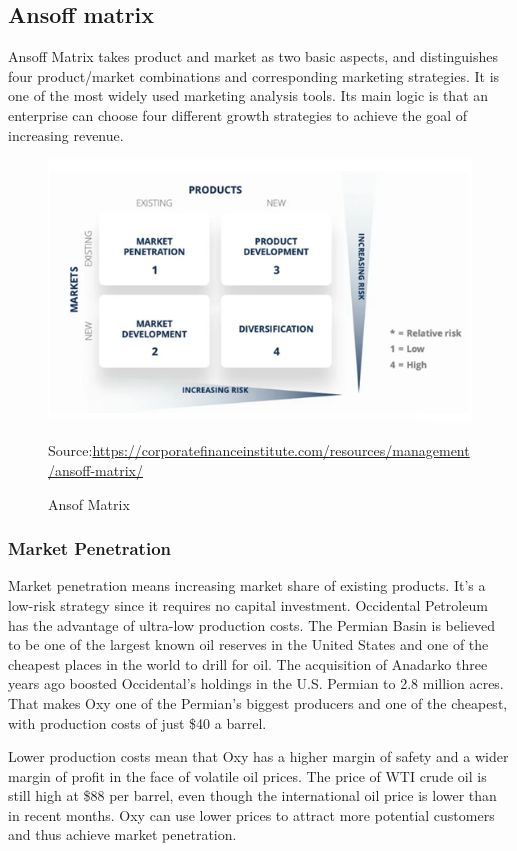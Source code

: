\documentclass[
	a4paper, %
	12pt,%
]{CSSullivanBusinessReport}
\begin{document}
\begin{fullwidth}
\subsection{Ansoff matrix}
Ansoff Matrix takes product and market as two basic aspects, and distinguishes four product/market combinations and corresponding marketing strategies. It is one of the most widely used marketing analysis tools. Its main logic is that an enterprise can choose four different growth strategies to achieve the goal of increasing revenue.
\begin{figure}[H]
    \centering
    \includegraphics{Images/Ansoff Matrix.png}
    \caption{Ansof Matrix}
    Source:\url{https://corporatefinanceinstitute.com/resources/management/ansoff-matrix/}
    \label{Ansof Matrix}
    
\end{figure}
\subsubsection{Market Penetration}
Market penetration means increasing market share of existing products. It’s a low-risk strategy since it requires no capital investment. Occidental Petroleum has the advantage of ultra-low production costs. The Permian Basin is believed to be one of the largest known oil reserves in the United States and one of the cheapest places in the world to drill for oil. The acquisition of Anadarko three years ago boosted Occidental's holdings in the U.S. Permian to 2.8 million acres. That makes Oxy one of the Permian's biggest producers and one of the cheapest, with production costs of just \$40 a barrel.
\par
Lower production costs mean that Oxy has a higher margin of safety and a wider margin of profit in the face of volatile oil prices. The price of WTI crude oil is still high at \$88 per barrel, even though the international oil price is lower than in recent months. Oxy can use lower prices to attract more potential customers and thus achieve market penetration.

\end{fullwidth}
\end{document}
